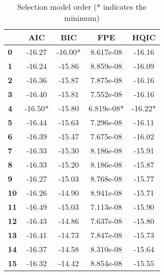 \begin{table}
\caption{Selection model order (* indicates the minimum)}
\label{criterios}
\begin{center}
\begin{tabular}{lcccc}
\toprule
            & \textbf{AIC} & \textbf{BIC} & \textbf{FPE} & \textbf{HQIC}  \\
\midrule
\textbf{0}  &      -16.27  &     -16.00*  &   8.617e-08  &       -16.16   \\
\textbf{1}  &      -16.24  &      -15.86  &   8.859e-08  &       -16.09   \\
\textbf{2}  &      -16.36  &      -15.87  &   7.875e-08  &       -16.16   \\
\textbf{3}  &      -16.40  &      -15.81  &   7.552e-08  &       -16.16   \\
\textbf{4}  &     -16.50*  &      -15.80  &  6.819e-08*  &      -16.22*   \\
\textbf{5}  &      -16.44  &      -15.63  &   7.296e-08  &       -16.11   \\
\textbf{6}  &      -16.39  &      -15.47  &   7.675e-08  &       -16.02   \\
\textbf{7}  &      -16.33  &      -15.30  &   8.186e-08  &       -15.91   \\
\textbf{8}  &      -16.33  &      -15.20  &   8.186e-08  &       -15.87   \\
\textbf{9}  &      -16.27  &      -15.03  &   8.768e-08  &       -15.77   \\
\textbf{10} &      -16.26  &      -14.90  &   8.941e-08  &       -15.71   \\
\textbf{11} &      -16.49  &      -15.03  &   7.113e-08  &       -15.90   \\
\textbf{12} &      -16.43  &      -14.86  &   7.637e-08  &       -15.80   \\
\textbf{13} &      -16.41  &      -14.73  &   7.847e-08  &       -15.73   \\
\textbf{14} &      -16.37  &      -14.58  &   8.310e-08  &       -15.64   \\
\textbf{15} &      -16.32  &      -14.42  &   8.854e-08  &       -15.55   \\
\bottomrule
\end{tabular}
\end{center}
\end{table}
